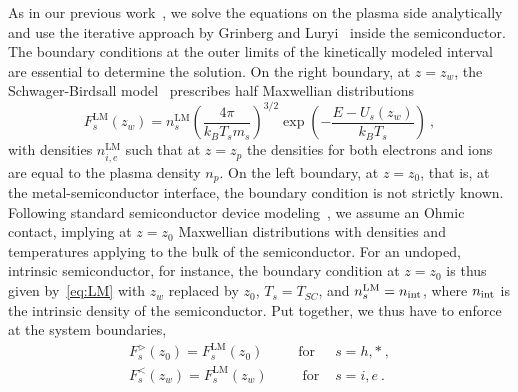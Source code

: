 \documentclass[pre,reprint,floats]{revtex4-1}
\begin{document}
As in our previous work~\cite{RBF20}, we solve the equations on the plasma side analytically and use the 
iterative approach by Grinberg and Luryi~\cite{GL92} inside the semiconductor. The boundary conditions at 
the outer limits of the kinetically modeled interval are essential to determine the solution. On the right 
boundary, at $z=z_w$, the Schwager-Birdsall model~\cite{SB90} prescribes half Maxwellian distributions
\begin{equation}
\label{eq:LM}
F_s^\mathrm{LM}(z_w)=
n_s^\mathrm{LM}\left( \frac{4\pi}{k_B T_s m_s}\right)^{3/2} \exp\left( -\frac{E-U_s(z_w)}{k_BT_s} \right)~,
\end{equation}
with densities $n_{i,e}^\textrm{LM}$ such that at $z=z_p$ the densities for both electrons and ions are 
equal to the plasma density $n_p$. On the left boundary, at $z=z_0$, that is, at the metal-semiconductor  
interface, the boundary condition is not strictly known. Following standard semiconductor device 
modeling~\cite{Moglestue93}, we assume an Ohmic contact, implying at $z=z_0$ Maxwellian distributions 
with densities and temperatures applying to the bulk of the semiconductor. For an undoped, intrinsic semiconductor, 
for instance, the boundary condition at $z=z_0$ is thus given by~\eqref{eq:LM} with $z_w$ replaced by $z_0$, 
$T_s=T_{SC}$, and $n_s^\mathrm{LM}=n_{\rm int}$, where $n_{\rm int}$ is the intrinsic density of the 
semiconductor. Put together, we thus have to enforce at the system boundaries,
\begin{subequations}
\begin{align}
F_s^> (z_0) = F_s^\mathrm{LM}(z_0)\hspace{30pt}\text{for }&s = h,*~, \label{eq:BC_z0}\\
F_s^< (z_w) = F_s^\mathrm{LM}(z_w)\hspace{30pt}\text{for }&s = i,e~.
\label{eq:BC_zw}
\end{align}
\end{subequations}
	
\end{document}
